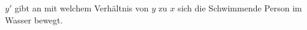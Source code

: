 \(y'\) gibt an mit welchem Verhältnis von \(y\) zu \(x\) sich die Schwimmende Person im Wasser bewegt.



































